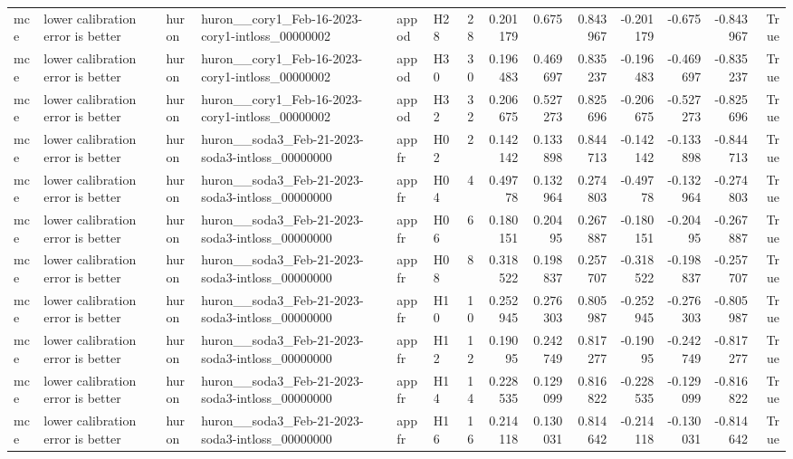 \begin{longtable}{llllllrrrrrrrr}
mce & lower calibration error is better & huron & huron\_\_cory1\_Feb-16-2023-cory1-intloss\_00000002 & appod & H28 & 28 & 0.201179 & 0.675 & 0.843967 & -0.201179 & -0.675 & -0.843967 & True \\
mce & lower calibration error is better & huron & huron\_\_cory1\_Feb-16-2023-cory1-intloss\_00000002 & appod & H30 & 30 & 0.196483 & 0.469697 & 0.835237 & -0.196483 & -0.469697 & -0.835237 & True \\
mce & lower calibration error is better & huron & huron\_\_cory1\_Feb-16-2023-cory1-intloss\_00000002 & appod & H32 & 32 & 0.206675 & 0.527273 & 0.825696 & -0.206675 & -0.527273 & -0.825696 & True \\
mce & lower calibration error is better & huron & huron\_\_soda3\_Feb-21-2023-soda3-intloss\_00000000 & appfr & H02 & 2 & 0.142142 & 0.133898 & 0.844713 & -0.142142 & -0.133898 & -0.844713 & True \\
mce & lower calibration error is better & huron & huron\_\_soda3\_Feb-21-2023-soda3-intloss\_00000000 & appfr & H04 & 4 & 0.49778 & 0.132964 & 0.274803 & -0.49778 & -0.132964 & -0.274803 & True \\
mce & lower calibration error is better & huron & huron\_\_soda3\_Feb-21-2023-soda3-intloss\_00000000 & appfr & H06 & 6 & 0.180151 & 0.20495 & 0.267887 & -0.180151 & -0.20495 & -0.267887 & True \\
mce & lower calibration error is better & huron & huron\_\_soda3\_Feb-21-2023-soda3-intloss\_00000000 & appfr & H08 & 8 & 0.318522 & 0.198837 & 0.257707 & -0.318522 & -0.198837 & -0.257707 & True \\
mce & lower calibration error is better & huron & huron\_\_soda3\_Feb-21-2023-soda3-intloss\_00000000 & appfr & H10 & 10 & 0.252945 & 0.276303 & 0.805987 & -0.252945 & -0.276303 & -0.805987 & True \\
mce & lower calibration error is better & huron & huron\_\_soda3\_Feb-21-2023-soda3-intloss\_00000000 & appfr & H12 & 12 & 0.19095 & 0.242749 & 0.817277 & -0.19095 & -0.242749 & -0.817277 & True \\
mce & lower calibration error is better & huron & huron\_\_soda3\_Feb-21-2023-soda3-intloss\_00000000 & appfr & H14 & 14 & 0.228535 & 0.129099 & 0.816822 & -0.228535 & -0.129099 & -0.816822 & True \\
mce & lower calibration error is better & huron & huron\_\_soda3\_Feb-21-2023-soda3-intloss\_00000000 & appfr & H16 & 16 & 0.214118 & 0.130031 & 0.814642 & -0.214118 & -0.130031 & -0.814642 & True \\

\end{longtable}
